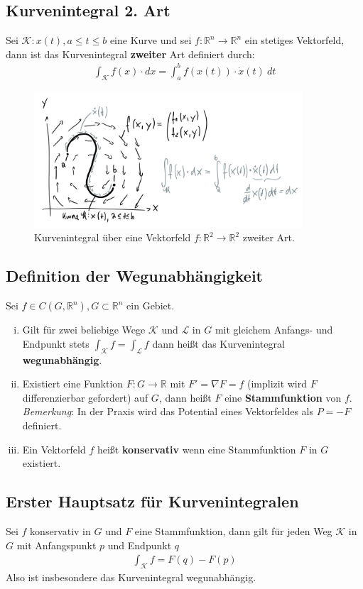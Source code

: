 \documentclass[11pt,a4paper]{book}
\newcommand {\R}	{\mathbb{R}}
\newcommand {\Rn}	{\mathbb{R}^n}
\newcommand {\Rzwei}	{\mathbb{R}^2}
\newcommand{\1}    	{\mathbbm{1}}
\newcommand{\Kurve}	{{\mathcal{K}}}
\newcommand{\Bemerkung}	{\noindent\textit{Bemerkung}: }
\begin{document}
\subsection*{Kurvenintegral 2. Art}
Sei \(\Kurve : x(t), a \leqslant t \leqslant b\) eine Kurve und sei \(f : \Rn \rightarrow \Rn\) ein stetiges Vektorfeld, dann ist das Kurvenintegral \textbf{zweiter} Art definiert durch:
\begin{align*}
	\int_\Kurve f(x) \cdot dx = \int_a^b f(x(t)) \cdot \dot{x}(t) ~dt
\end{align*}
\begin{figure}[!h]
  	\centering
 	\includegraphics[width=10cm]{grafiken/Kurvenint_zweiter_Art.png}
  	\caption{Kurvenintegral über eine Vektorfeld \(f:\Rzwei \rightarrow \Rzwei\) zweiter Art.}
\end{figure}

\subsection{Definition der Wegunabhängigkeit}
Sei \(f \in C(G,\Rn), G \subset \Rn\) ein Gebiet.
\begin{enumerate}[(i)]
	\item Gilt für zwei beliebige Wege \(\Kurve\) und \(\mathcal{L}\) in \(G\) mit gleichem Anfangs- und Endpunkt stets \(\int_\Kurve f = \int_\mathcal{L} f\) dann heißt das Kurvenintegral \textbf{wegunabhängig}.
	\item Existiert eine Funktion \(F:G \rightarrow \R\) mit \(F' = \nabla F = f\) (implizit wird \(F\) differenzierbar gefordert) auf \(G\), dann heißt \(F\) eine \textbf{Stammfunktion} von \(f\).\\
	\Bemerkung In der Praxis wird das Potential eines Vektorfeldes als \(P = -F\) definiert.
	\item Ein Vektorfeld \(f\) heißt \textbf{konservativ} wenn eine Stammfunktion \(F\) in \(G\) existiert.
\end{enumerate}

\subsection{Erster Hauptsatz für Kurvenintegralen}
\label{sec:HS_kurvenint}
Sei \(f\) konservativ in \(G\) und \(F\) eine Stammfunktion, dann gilt für jeden Weg \(\Kurve\) in \(G\) mit Anfangspunkt \(p\) und Endpunkt \(q\)
\begin{align*}
	\int_\Kurve f = F(q) - F(p)
\end{align*}
Also ist insbesondere das Kurvenintegral wegunabhängig.
\end{document}
